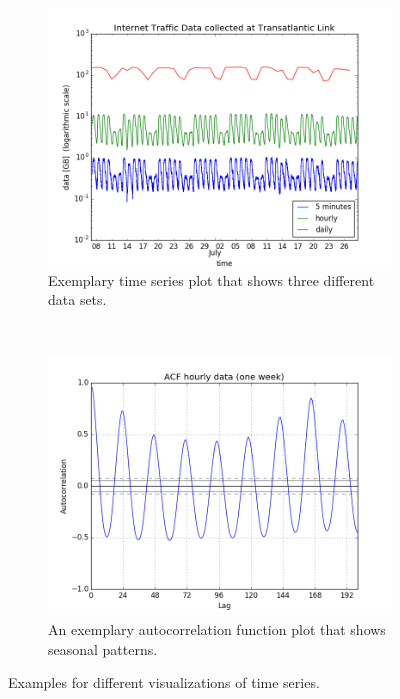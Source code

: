 \documentclass[12pt, a4paper]{article}
\begin{document}
\begin{figure}[ht!]
  \centering
  \begin{subfigure}[b]{0.45\textwidth}
    \includegraphics[width=\textwidth]{images/timeplot.png}
    \caption{Exemplary time series plot that shows three different data sets.}
    \label{fig:time_series_plots}
  \end{subfigure}
  ~
  \begin{subfigure}[b]{0.45\textwidth}
    \includegraphics[width=\textwidth]{images/acf.png}
    \caption{An exemplary autocorrelation function plot that shows seasonal patterns.}
    \label{fig:acf}
  \end{subfigure}
  \caption{Examples for different visualizations of time series.}
\end{figure}
\end{document}
